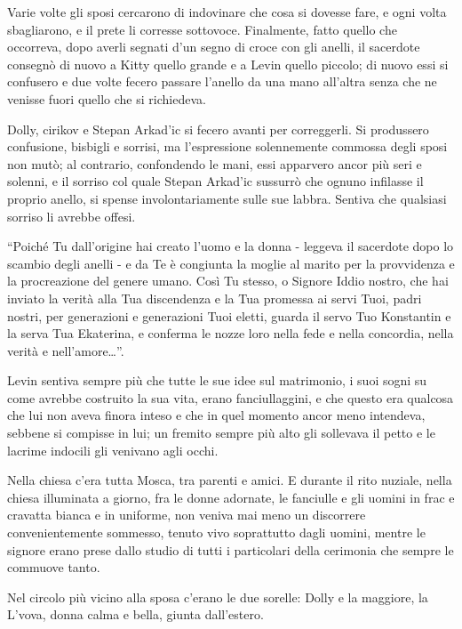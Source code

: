 Varie volte gli sposi cercarono di indovinare che cosa si dovesse fare, e ogni volta sbagliarono, e il prete li corresse sottovoce. Finalmente, fatto quello che occorreva, dopo averli segnati d'un segno di croce con gli anelli, il sacerdote consegnò di nuovo a Kitty quello grande e a Levin quello piccolo; di nuovo essi si confusero e due volte fecero passare l'anello da una mano all'altra senza che ne venisse fuori quello che si richiedeva. 

Dolly, cirikov e Stepan Arkad'ic si fecero avanti per correggerli. Si produssero confusione, bisbigli e sorrisi, ma l'espressione solennemente commossa degli sposi non mutò; al contrario, confondendo le mani, essi apparvero ancor più seri e solenni, e il sorriso col quale Stepan Arkad'ic sussurrò che ognuno infilasse il proprio anello, si spense involontariamente sulle sue labbra. Sentiva che qualsiasi sorriso li avrebbe offesi. 

``Poiché Tu dall'origine hai creato l'uomo e la donna - leggeva il sacerdote dopo lo scambio degli anelli - e da Te è congiunta la moglie al marito per la provvidenza e la procreazione del genere umano. Così Tu stesso, o Signore Iddio nostro, che hai inviato la verità alla Tua discendenza e la Tua promessa ai servi Tuoi, padri nostri, per generazioni e generazioni Tuoi eletti, guarda il servo Tuo Konstantin e la serva Tua Ekaterina, e conferma le nozze loro nella fede e nella concordia, nella verità e nell'amore\ldots{}''. 

Levin sentiva sempre più che tutte le sue idee sul matrimonio, i suoi sogni su come avrebbe costruito la sua vita, erano fanciullaggini, e che questo era qualcosa che lui non aveva finora inteso e che in quel momento ancor meno intendeva, sebbene si compisse in lui; un fremito sempre più alto gli sollevava il petto e le lacrime indocili gli venivano agli occhi. 

\label{v-4} 

Nella chiesa c'era tutta Mosca, tra parenti e amici. E durante il rito nuziale, nella chiesa illuminata a giorno, fra le donne adornate, le fanciulle e gli uomini in frac e cravatta bianca e in uniforme, non veniva mai meno un discorrere convenientemente sommesso, tenuto vivo soprattutto dagli uomini, mentre le signore erano prese dallo studio di tutti i particolari della cerimonia che sempre le commuove tanto. 

Nel circolo più vicino alla sposa c'erano le due sorelle: Dolly e la maggiore, la L'vova, donna calma e bella, giunta dall'estero. 

